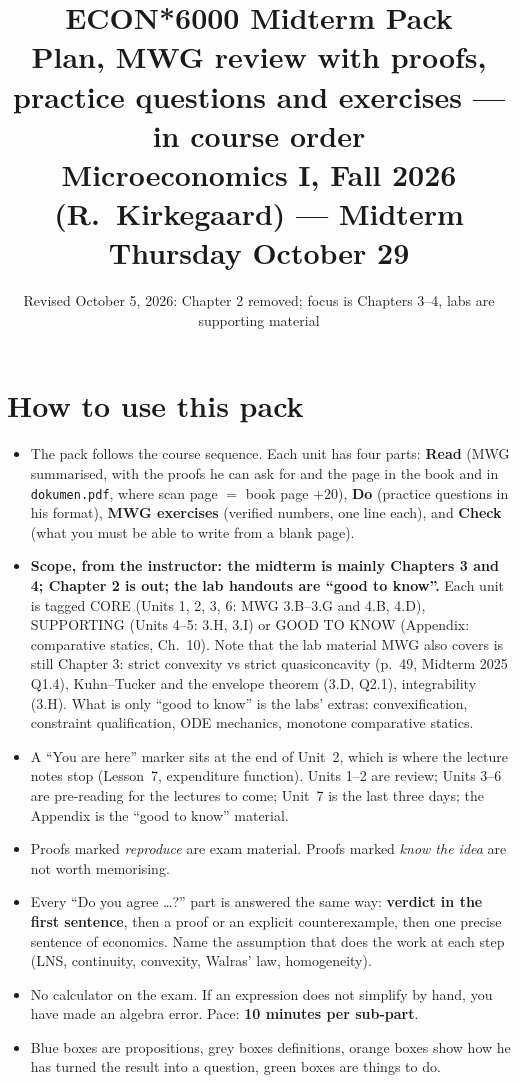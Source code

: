 \documentclass[11pt]{article}
\title{\textbf{ECON*6000 Midterm Pack}\\[3pt]\large Plan, MWG review with proofs, practice questions and exercises --- in course order\\[2pt]
\normalsize Microeconomics I, Fall 2026 (R.~Kirkegaard) --- Midterm Thursday October 29}
\author{}\date{Revised October 5, 2026: Chapter 2 removed; focus is Chapters 3--4, labs are supporting material}
\begin{document}
\maketitle
\thispagestyle{fancy}

\section*{How to use this pack}
\begin{itemize}
\item The pack follows the course sequence. Each unit has four parts: \textbf{Read} (MWG summarised, with the proofs he can ask for and the page in the book and in \texttt{dokumen.pdf}, where scan page $=$ book page $+20$), \textbf{Do} (practice questions in his format), \textbf{MWG exercises} (verified numbers, one line each), and \textbf{Check} (what you must be able to write from a blank page).
\item \textbf{Scope, from the instructor: the midterm is mainly Chapters 3 and 4; Chapter 2 is out; the lab handouts are ``good to know''.} Each unit is tagged CORE (Units 1, 2, 3, 6: MWG 3.B--3.G and 4.B, 4.D), SUPPORTING (Units 4--5: 3.H, 3.I) or GOOD TO KNOW (Appendix: comparative statics, Ch.~10). Note that the lab material MWG also covers is still Chapter 3: strict convexity vs strict quasiconcavity (p.~49, Midterm 2025 Q1.4), Kuhn--Tucker and the envelope theorem (3.D, Q2.1), integrability (3.H). What is only ``good to know'' is the labs' extras: convexification, constraint qualification, ODE mechanics, monotone comparative statics.
\item A ``You are here'' marker sits at the end of Unit~2, which is where the lecture notes stop (Lesson~7, expenditure function). Units 1--2 are review; Units 3--6 are pre-reading for the lectures to come; Unit~7 is the last three days; the Appendix is the ``good to know'' material.
\item Proofs marked \emph{reproduce} are exam material. Proofs marked \emph{know the idea} are not worth memorising.
\item Every ``Do you agree \dots?'' part is answered the same way: \textbf{verdict in the first sentence}, then a proof or an explicit counterexample, then one precise sentence of economics. Name the assumption that does the work at each step (LNS, continuity, convexity, Walras' law, homogeneity).
\item No calculator on the exam. If an expression does not simplify by hand, you have made an algebra error. Pace: \textbf{10 minutes per sub-part}.
\item Blue boxes are propositions, grey boxes definitions, orange boxes show how he has turned the result into a question, green boxes are things to do.
\end{itemize}
\end{document}
